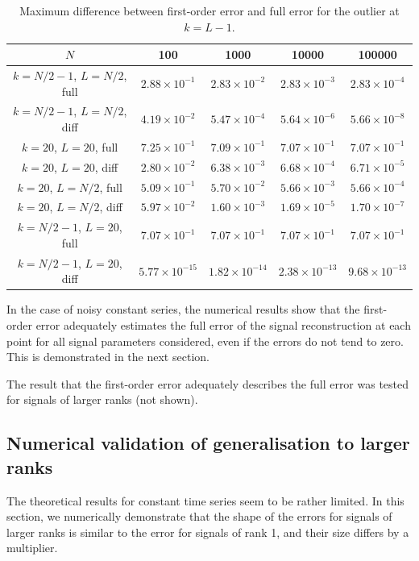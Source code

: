\documentclass[engproc, submit, article,pdftex,moreauthors]{Definitions/mdpi}
\begin{document}
\begin{table}[H]
	\begin{center}
		\caption{Maximum difference between first-order error and full error for the outlier at $k=L-1$.}
		\label{tab:const_outl}
\begin{tabular}{ccccc}
  \hline
 $N$& 100 & 1000 & 10000 & 100000 \\
  \hline
$k=N/2-1$, $L=N/2$, full & $2.88 \times 10^{-1}$ & $2.83 \times 10^{-2}$ & $2.83 \times 10^{-3}$ & $2.83 \times 10^{-4}$ \\
$k=N/2-1$, $L=N/2$, diff  & $4.19 \times 10^{-2}$ & $5.47 \times 10^{-4}$ & $5.64 \times 10^{-6}$ & $5.66 \times 10^{-8}$ \\
\hline
  $k=20$, $L=20$, full  & $7.25 \times 10^{-1}$ & $7.09 \times 10^{-1}$ & $7.07 \times 10^{-1}$ & $7.07 \times 10^{-1}$ \\
  $k=20$, $L=20$, diff  & $2.80 \times 10^{-2}$ & $6.38 \times 10^{-3}$ & $6.68 \times 10^{-4}$ & $6.71 \times 10^{-5}$ \\
  \hline
  $k = 20$, $L=N/2$, full& $5.09 \times 10^{-1}$ & $5.70 \times 10^{-2}$ & $5.66 \times 10^{-3}$ & $5.66 \times 10^{-4}$ \\
  $k = 20$, $L=N/2$, diff & $5.97 \times 10^{-2}$ & $1.60 \times 10^{-3}$ & $1.69 \times 10^{-5}$ & $1.70 \times 10^{-7}$ \\
  \hline
  $k = N/2-1$, $L=20$, full & $7.07 \times 10^{-1}$ & $7.07 \times 10^{-1}$ & $7.07 \times 10^{-1}$ & $7.07 \times 10^{-1}$ \\
  $k = N/2-1$, $L=20$, diff & $5.77 \times 10^{-15}$ & $1.82 \times 10^{-14}$ & $2.38 \times 10^{-13}$ & $9.68 \times 10^{-13}$ \\
   \hline
\end{tabular}
\end{center}
\end{table}

\medskip
In the case of noisy constant series, the numerical results show that the first-order error adequately estimates the full error of the signal reconstruction at each point for all signal parameters considered, even if the errors do not tend to zero.
This is demonstrated in the next section.

The result that the first-order error adequately describes the full error was tested for signals of larger ranks (not shown).

\subsection{Numerical validation of generalisation to larger ranks}
The theoretical results for constant time series seem to be rather limited. In this section, we numerically demonstrate that the shape of the errors for signals of larger ranks is similar to the error for signals of rank 1, and their size differs by a multiplier.
\end{document}
